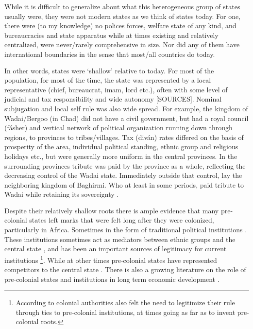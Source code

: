 \documentclass[12pt]{article}
\begin{document}

While it is difficult to generalize about what this heterogeneous group of
states usually were, they were not modern states as we think of states today.
For one, there were (to my knowledge) no polices forces, welfare state of any
kind, and bureaucracies and state apparatus while at times existing and
relatively centralized, were never/rarely comprehensive in size. Nor did any of
them have international boundaries in the sense that most/all countries do
today. 

In other words, states were `shallow' relative to today. For most of the
population, for most of the time, the state was represented by a local
representative (chief, bureaucrat, imam, lord etc.), often with some level of
judicial and tax responsibility and wide autonomy [SOURCES]. Nominal subjugation
and local self rule was also wide spread. For example, the kingdom of
Wadai/Bergoo (in Chad) did not have a civil government, but had a royal council
(fásher) and vertical network of political organization running down through
regions, to provinces to tribes/villages\citep{barth1857travels}. Tax (diván)
rates differed on the basis of prosperity of the area, individual political
standing, ethnic group and religious holidays etc., but were generally more
uniform in the central provinces. In the surrounding provinces tribute was paid
by the province as a whole, reflecting the decreasing control of the Wadai
state. Immediately outside that control, lay the neighboring kingdom of
Baghirmi. Who at least in some periods, paid tribute to Wadai while retaining
its sovereignty \citep{barth1857travels}.

Despite their relatively shallow roots there is ample evidence that many
pre-colonial states left marks that were felt long after they were colonized,
particularly in Africa. Sometimes in the form of traditional political
institutions \citep{Beall_2005, Holzinger_2020, Neupert_Wentz_2021, Ubink_2008}.
These institutions sometimes act as mediators between ethnic groups and the
central state \citep{boone2014property, Englebert2002}, and has been an
important sources of legitimacy for current institutions
\citep{Wig2016}\footnote{According to \citet{mamdani2018citizen} colonial
	authorities also felt the need to legitimize their rule through ties to
	pre-colonial institutions, at times going as far as to invent
pre-colonial roots.}. While at other times pre-colonial states have represented
competitors to the central state \citep{Herbst2014}. There is also a growing
literature on the role of pre-colonial states and institutions in long term
economic development \citep{Michalopoulos2018, Acemoglu2014, Gennaioli2007,
Bockstette2002}.
\end{document}
